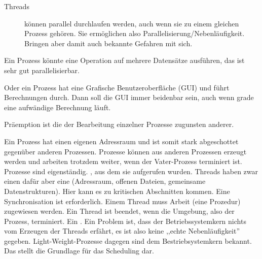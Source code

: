 \begin{answer}
\begin{description}
\item[Threads] können parallel durchlaufen werden, auch wenn sie zu einem gleichen Prozess gehören. Sie ermöglichen also Parallelisierung/Nebenläufigkeit. Bringen aber damit auch bekannte Gefahren mit sich. 
\end{description}

Ein Prozess könnte eine Operation auf mehrere Datensätze ausführen, das ist sehr gut parallelisierbar.

Oder ein Prozess hat eine Grafische Benutzeroberfläche (GUI) und führt Berechnungen durch. Dann soll die GUI immer beidenbar sein, auch wenn grade eine aufwändige Berechnung läuft.
\end{answer}

\begin{answer}
Präemption ist die  der Bearbeitung einzelner Prozesse zugunsten anderer.
\end{answer}

\begin{answer}
Ein Prozess hat einen eigenen Adressraum und ist somit stark abgeschottet gegenüber anderen
Prozessen. Prozesse können aus anderen Prozessen erzeugt werden und arbeiten trotzdem weiter,
wenn der Vater-Prozess terminiert ist. Prozesse sind eigenständig.
, aus dem sie aufgerufen
wurden. Threads haben zwar einen  dafür aber eine
 (Adressraum, offenen Dateien, gemeinsame Datenstrukturen). Hier kann 
es zu kritischen Abschnitten kommen. Eine Synchronisation ist erforderlich. Einem Thread muss
Arbeit (eine Prozedur) zugewiesen werden. Ein Thread ist beendet, wenn die Umgebung, also der Prozess,
terminiert. Ein .
Ein Problem ist, dass der Betriebssystemkern nichts vom Erzeugen der Threads erfährt, es ist also
keine ,,echte Nebenläufigkeit'' gegeben.
Light-Weight-Prozesse dagegen sind dem Bestriebsystemkern bekannt. Das stellt die Grundlage
für das Scheduling dar.
\end{answer}

